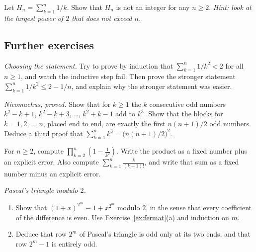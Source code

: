 \begin{exercise}[$\star\star\star$]\label{ex:harmonic}
Let $H_n=\sum_{k=1}^n 1/k$. Show that $H_n$ is not an integer for any $n\ge2$. \emph{Hint: look at the largest power of $2$ that does not exceed $n$.}
\end{exercise}

\subsection*{Further exercises}

\begin{exercise}[$\star$]\label{ex:sumsq}
\emph{Choosing the statement.} Try to prove by induction that $\sum_{k=1}^n 1/k^2<2$ for all $n\ge1$, and watch the inductive step fail. Then prove the stronger statement $\sum_{k=1}^n 1/k^2\le 2-1/n$, and explain why the stronger statement was easier.
\end{exercise}

\begin{exercise}[$\star$]\label{ex:odds}
\emph{Nicomachus, proved.} Show that for $k\ge1$ the $k$ consecutive odd numbers $k^2-k+1$, $k^2-k+3$, \dots, $k^2+k-1$ add to $k^3$. Show that the blocks for $k=1,2,\dots,n$, placed end to end, are exactly the first $n(n+1)/2$ odd numbers. Deduce a third proof that $\sum_{k=1}^n k^3=\bigl(n(n+1)/2\bigr)^2$.
\end{exercise}

\begin{exercise}[$\star$]\label{ex:telprod}
For $n\ge2$, compute $\displaystyle\prod_{k=2}^n\left(1-\frac{1}{k^2}\right)$. Write the product as a fixed number plus an explicit error. Also compute $\displaystyle\sum_{k=1}^n\frac{k}{(k+1)!}$, and write that sum as a fixed number minus an explicit error.
\end{exercise}

\begin{exercise}[$\star\star$]\label{ex:pascalmod2}
\emph{Pascal's triangle modulo $2$.}
\begin{enumerate}[label=(\alph*)]
\item Show that $(1+x)^{2^m}\equiv1+x^{2^m}$ modulo $2$, in the sense that every coefficient of the difference is even. Use Exercise~\ref{ex:fermat}(a) and induction on $m$.
\item Deduce that row $2^m$ of Pascal's triangle is odd only at its two ends, and that row $2^m-1$ is entirely odd.
\end{enumerate}
\end{exercise}

